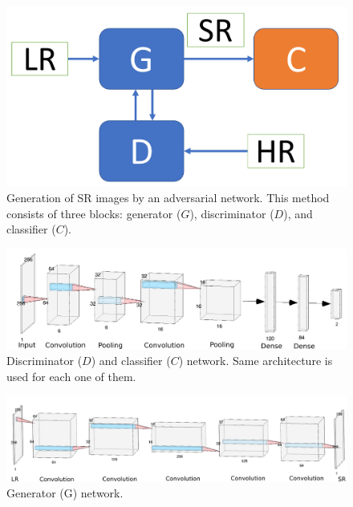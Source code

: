 \documentclass[10pt,twocolumn,letterpaper]{article}
\begin{document}
\begin{figure}[h]
\begin{center}
\includegraphics[scale=0.25]{cgan.pdf}
\end{center}
   \caption{Generation of SR images by an adversarial network. This method consists of three blocks: generator ($G$), discriminator ($D$), and classifier ($C$).}
\label{fig:cgan}
\end{figure}

\begin{figure}[h]
\begin{center}
\includegraphics[scale=0.20]{D_net.png}
\end{center}
   \caption{Discriminator ($D$) and classifier ($C$) network. Same architecture is used for each one of them.}
\label{fig:D_net}
\end{figure}

\begin{figure}[h]
\begin{center}
\includegraphics[scale=0.17]{G_net.png}
\end{center}
\label{fig:G_net}
\caption{Generator (G) network.}
\end{figure}
\end{document}
